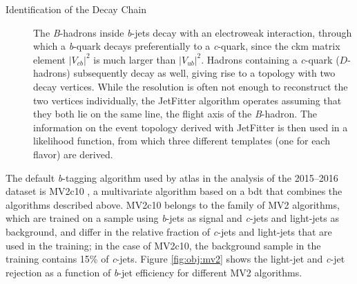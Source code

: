 \begin{description}
\item[Identification of the Decay Chain] The \textit{B}-hadrons inside \textit{b}-jets decay with an electroweak interaction, 
through which a \textit{b}-quark decays preferentially to a \textit{c}-quark, since the \gls{ckm} matrix element $|V_{cb}|^2$ is much larger than $|V_{ub}|^2$. Hadrons containing a \textit{c}-quark ($D$-hadrons) subsequently decay as well, giving rise to a topology with two decay vertices. While the resolution is often not enough to reconstruct the two vertices individually, the JetFitter algorithm \cite{1742-6596-119-3-032032} operates assuming that they both lie on the same line, the flight axis of the \textit{B}-hadron. The information on the event topology derived with JetFitter is then used in a likelihood function, from which three different templates (one for each flavor) are derived.

\end{description}

The default \textit{b}-tagging algorithm used by \gls{atlas} in the analysis of the 2015--2016 dataset is MV2c10 
\cite{ATL-PHYS-PUB-2015-022,ATL-PHYS-PUB-2016-012}, 
a multivariate algorithm based on a \gls{bdt} that combines the algorithms described above. 
MV2c10 belongs to the family of MV2 algorithms, which are trained on a \ttbar sample using \textit{b}-jets as signal and \textit{c}-jets and light-jets as background, and differ in the relative fraction of \textit{c}-jets and light-jets that are
used in the training; in the case of MV2c10, the background sample in the training contains 15\% of \textit{c}-jets.
Figure \ref{fig:obj:mv2} shows the light-jet and \textit{c}-jet rejection as a function of \textit{b}-jet efficiency for different MV2 algorithms.

